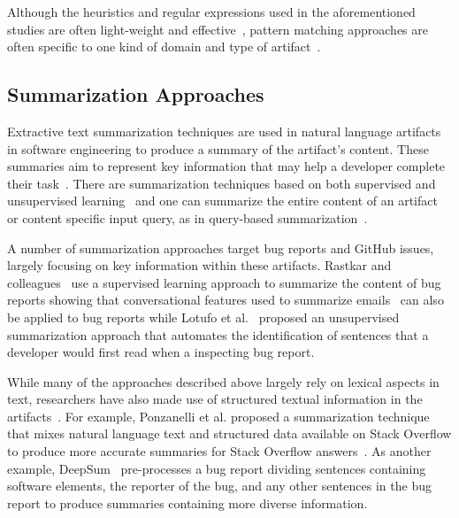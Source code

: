Although the heuristics and regular expressions used in the aforementioned studies 
are often light-weight and effective~\cite{Bavota2016, Maalej2013}, 
pattern matching approaches are often specific to one kind of domain and 
type of artifact~\cite{fucci2019}. 





\subsection{Summarization Approaches}
\label{cp2:summarization}



Extractive text summarization techniques are used in natural language artifacts in software engineering to
produce a summary of the artifact's content. These summaries aim to represent key information that may help a developer complete their task~\cite{Bavota2016}.
There are summarization techniques based on both supervised and unsupervised learning~\cite{moreno2017}
and one can summarize the entire content of an artifact
or content specific input query, as in query-based summarization~\cite{Huang2018, Goldsteinet1999}.




A number of summarization approaches target bug reports and GitHub issues, largely
focusing on key information within these artifacts. 
Rastkar and colleagues~\cite{Rastkar2010} use a supervised learning approach to summarize the content 
of bug reports showing that conversational features used to summarize emails~\cite{Murray2008}
can also be applied to bug reports while
Lotufo et al.~\cite{Lotufo2012} proposed an unsupervised summarization approach 
that automates the identification of sentences that a developer would first read when
a inspecting bug report.



While many of the approaches described above
largely rely on  lexical aspects in text, researchers have also made use
of structured textual information in the artifacts~\cite{Ponzanelli2015, Treude2016, chen2016}. 
For example, Ponzanelli et al. 
proposed a summarization technique that mixes natural language text and structured data 
available on Stack Overflow
to produce more accurate summaries for Stack Overflow answers~\cite{Ponzanelli2015}. 
As another example, DeepSum~\cite{Li2018} pre-processes a bug report dividing sentences 
containing software elements, the reporter of the bug, and any other sentences 
in the bug report to produce summaries containing more diverse information.




